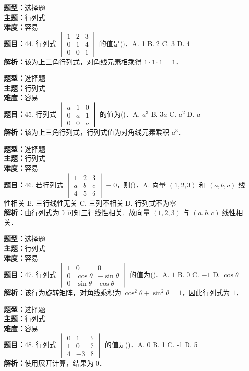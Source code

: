 \documentclass{ctexart}
\newenvironment{question}[5]{%
	\noindent\textbf{题型：}#1\\
	\textbf{主题：}#2\\
	\textbf{难度：}#3\\
	\textbf{题目：}#4\\
	\textbf{解析：}#5\\
	\vspace{1em}
}{}
\begin{document}
	\begin{question}
		{选择题}
		{行列式}
		{容易}
		{44. 行列式 \(\begin{vmatrix} 1 & 2 & 3 \\ 0 & 1 & 4 \\ 0 & 0 & 1\end{vmatrix}\) 的值是(\qquad)．A. 1 B. 2 C. 3 D. 4}
		{该为上三角行列式，对角线元素相乘得 \(1 \cdot 1 \cdot 1 = 1\)．}
	\end{question}
	
	\begin{question}
		{选择题}
		{行列式}
		{容易}
		{45. 行列式 \(\begin{vmatrix} a & 1 & 0 \\ 0 & a & 1 \\ 0 & 0 & a\end{vmatrix}\) 的值为(\qquad)．A. \(a^3\) B. \(3a\) C. \(a^2\) D. \(a\)}
		{该为上三角行列式，行列式值为对角线元素乘积 \(a^3\)．}
	\end{question}
	
	\begin{question}
		{选择题}
		{行列式}
		{容易}
		{46. 若行列式 \(\begin{vmatrix} 1 & 2 & 3 \\ a & b & c \\ 4 & 5 & 6\end{vmatrix}=0\)，则(\qquad)．A. 向量 \((1,2,3)\) 和 \((a,b,c)\) 线性相关 B. 三行线性无关 C. 三列不相关 D. 行列式不为零}
		{由行列式为 0 可知三行线性相关，故向量 \((1,2,3)\) 与 \((a,b,c)\) 线性相关．}
	\end{question}
	
	\begin{question}
		{选择题}
		{行列式}
		{容易}
		{47. 行列式 \(\begin{vmatrix} 1 & 0 & 0 \\ 0 & \cos\theta & -\sin\theta \\ 0 & \sin\theta & \cos\theta\end{vmatrix}\) 的值为(\qquad)．A. \(1\) B. \(0\) C. \(-1\) D. \(\cos\theta\)}
		{该行为旋转矩阵，对角线乘积为 \(\cos^2\theta + \sin^2\theta = 1\)，因此行列式为 \(1\)．}
	\end{question}
	
	\begin{question}
		{选择题}
		{行列式}
		{容易}
		{48. 行列式 \(\begin{vmatrix} 0 & 1 & 2 \\ 1 & 0 & 3 \\ 4 & -3 & 8\end{vmatrix}\) 的值是(\qquad)．A. 0 B. 1 C. -1 D. 5}
		{使用展开计算，结果为 0．}
	\end{question}
	
\end{document}

